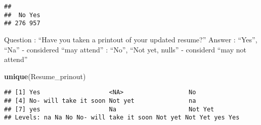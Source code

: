 \documentclass[]{article}
\newenvironment{Shaded}{\begin{snugshade}}{\end{snugshade}}
\newcommand{\KeywordTok}[1]{\textcolor[rgb]{0.13,0.29,0.53}{\textbf{#1}}}
\newcommand{\DataTypeTok}[1]{\textcolor[rgb]{0.13,0.29,0.53}{#1}}
\newcommand{\StringTok}[1]{\textcolor[rgb]{0.31,0.60,0.02}{#1}}
\newcommand{\CommentTok}[1]{\textcolor[rgb]{0.56,0.35,0.01}{\textit{#1}}}
\newcommand{\OperatorTok}[1]{\textcolor[rgb]{0.81,0.36,0.00}{\textbf{#1}}}
\newcommand{\NormalTok}[1]{#1}
\begin{document}
\begin{Shaded}
\end{Shaded}

\begin{verbatim}
## 
##  No Yes 
## 276 957
\end{verbatim}

Question : ``Have you taken a printout of your updated resume?'' Answer
: ``Yes'', ``Na'' - considered ``may attend'' : ``No'', ``Not yet,
nulls'' - considerd ``may not attend''

\begin{Shaded}
\begin{Highlighting}[]
\KeywordTok{unique}\NormalTok{(Resume_prinout)}
\end{Highlighting}
\end{Shaded}

\begin{verbatim}
## [1] Yes                   <NA>                  No                   
## [4] No- will take it soon Not yet               na                   
## [7] yes                   Na                    Not Yet              
## Levels: na Na No No- will take it soon Not yet Not Yet yes Yes
\end{verbatim}
\end{document}
